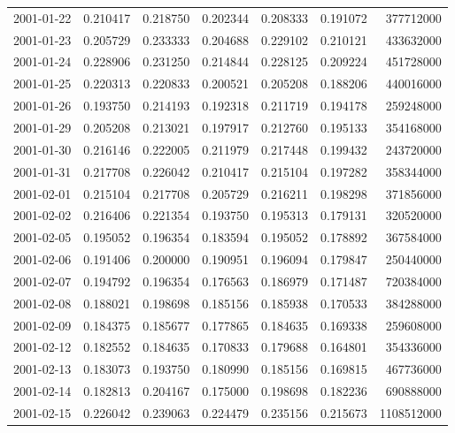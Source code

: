 \begin{tabular}{lrrrrrr}
2001-01-22 &    0.210417 &    0.218750 &    0.202344 &    0.208333 &    0.191072 &   377712000 \\
2001-01-23 &    0.205729 &    0.233333 &    0.204688 &    0.229102 &    0.210121 &   433632000 \\
2001-01-24 &    0.228906 &    0.231250 &    0.214844 &    0.228125 &    0.209224 &   451728000 \\
2001-01-25 &    0.220313 &    0.220833 &    0.200521 &    0.205208 &    0.188206 &   440016000 \\
2001-01-26 &    0.193750 &    0.214193 &    0.192318 &    0.211719 &    0.194178 &   259248000 \\
2001-01-29 &    0.205208 &    0.213021 &    0.197917 &    0.212760 &    0.195133 &   354168000 \\
2001-01-30 &    0.216146 &    0.222005 &    0.211979 &    0.217448 &    0.199432 &   243720000 \\
2001-01-31 &    0.217708 &    0.226042 &    0.210417 &    0.215104 &    0.197282 &   358344000 \\
2001-02-01 &    0.215104 &    0.217708 &    0.205729 &    0.216211 &    0.198298 &   371856000 \\
2001-02-02 &    0.216406 &    0.221354 &    0.193750 &    0.195313 &    0.179131 &   320520000 \\
2001-02-05 &    0.195052 &    0.196354 &    0.183594 &    0.195052 &    0.178892 &   367584000 \\
2001-02-06 &    0.191406 &    0.200000 &    0.190951 &    0.196094 &    0.179847 &   250440000 \\
2001-02-07 &    0.194792 &    0.196354 &    0.176563 &    0.186979 &    0.171487 &   720384000 \\
2001-02-08 &    0.188021 &    0.198698 &    0.185156 &    0.185938 &    0.170533 &   384288000 \\
2001-02-09 &    0.184375 &    0.185677 &    0.177865 &    0.184635 &    0.169338 &   259608000 \\
2001-02-12 &    0.182552 &    0.184635 &    0.170833 &    0.179688 &    0.164801 &   354336000 \\
2001-02-13 &    0.183073 &    0.193750 &    0.180990 &    0.185156 &    0.169815 &   467736000 \\
2001-02-14 &    0.182813 &    0.204167 &    0.175000 &    0.198698 &    0.182236 &   690888000 \\
2001-02-15 &    0.226042 &    0.239063 &    0.224479 &    0.235156 &    0.215673 &  1108512000 \\

\end{tabular}
